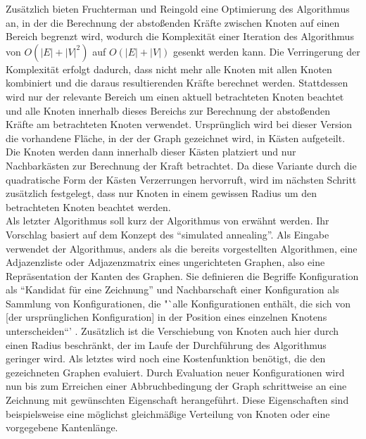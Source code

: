 \documentclass[12pt, a4paper]{article}
\begin{document}
Zusätzlich bieten Fruchterman und Reingold eine Optimierung des Algorithmus an, in der die Berechnung der abstoßenden Kräfte zwischen Knoten auf einen Bereich begrenzt wird, wodurch die Komplexität einer Iteration des Algorithmus von $O(|E| + |V|^2)$ auf $O(|E| + |V|)$ gesenkt werden kann. Die Verringerung der Komplexität erfolgt dadurch, dass nicht mehr alle Knoten mit allen Knoten kombiniert und die daraus resultierenden Kräfte berechnet werden. Stattdessen wird nur der relevante Bereich um einen aktuell betrachteten Knoten beachtet und alle Knoten innerhalb dieses Bereichs zur Berechnung der abstoßenden Kräfte am betrachteten Knoten verwendet. Ursprünglich wird bei dieser Version die vorhandene Fläche, in der der Graph gezeichnet wird, in Kästen aufgeteilt. Die Knoten werden dann innerhalb dieser Kästen platziert und nur Nachbarkästen zur Berechnung der Kraft betrachtet. Da diese Variante durch die quadratische Form der Kästen Verzerrungen hervorruft, wird im nächsten Schritt zusätzlich festgelegt, dass nur Knoten in einem gewissen Radius um den betrachteten Knoten beachtet werden.\\

Als letzter Algorithmus soll kurz der Algorithmus von  erwähnt werden. Ihr Vorschlag basiert auf dem Konzept des "`simulated annealing"'. Als Eingabe verwendet der Algorithmus, anders als die bereits vorgestellten Algorithmen, eine Adjazenzliste oder Adjazenzmatrix eines ungerichteten Graphen, also eine Repräsentation der Kanten des Graphen. Sie definieren die Begriffe Konfiguration als "`Kandidat für eine Zeichnung"' und Nachbarschaft einer Konfiguration als Sammlung von Konfigurationen, die "`alle Konfigurationen enthält, die sich von [der ursprünglichen Konfiguration] in der Position eines einzelnen Knotens unterscheiden“' \cite[S.~306]{davidson1996drawing}. Zusätzlich ist die Verschiebung von Knoten auch hier durch einen Radius beschränkt, der im Laufe der Durchführung des Algorithmus geringer wird. Als letztes wird noch eine Kostenfunktion benötigt, die den gezeichneten Graphen evaluiert. Durch Evaluation neuer Konfigurationen wird nun bis zum Erreichen einer Abbruchbedingung der Graph schrittweise an eine Zeichnung mit gewünschten Eigenschaft herangeführt. Diese Eigenschaften sind beispielsweise eine möglichst gleichmäßige Verteilung von Knoten oder eine vorgegebene Kantenlänge.\\
\end{document}
